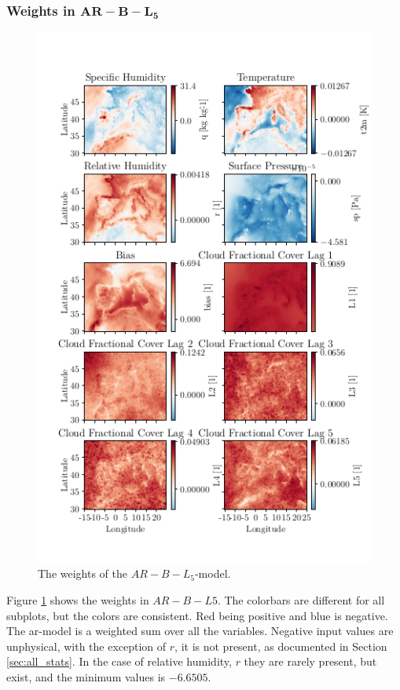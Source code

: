 \subsubsection{Weights in $\mathbf{AR-B-L_5}$}
\begin{figure}
    \centering
    \includegraphics[scale=0.9]{python_figs/weights_AR-B-L5_best_ar_model.png}
    \caption{The weights of the $AR-B-L_5$-model.}
    \label{fig:weights_best_model}
\end{figure}
Figure \ref{fig:weights_best_model} shows the weights in $AR-B-L5$. The colorbars are different for all subplots, but the colors are consistent. Red being positive and blue is negative. The \acrshort{ar}-model is a weighted sum over all the variables. Negative input values are unphysical, with the exception of $r$, it is not present, as documented in Section \ref{sec:all_stats}. In the case of relative humidity, $r$ they are rarely present, but exist, and the minimum values is $-6.6505$. 

